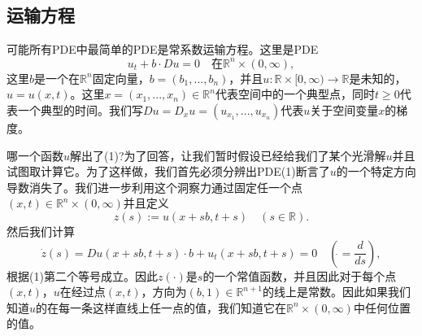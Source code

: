 \documentclass[leqno]{article}
\numberwithin{equation}{subsection}%
\begin{document}
\subsection{运输方程}
\noindent 可能所有PDE中最简单的PDE是常系数运输方程。这里是PDE
\begin{equation}
u_{t}+b\cdot Du=0\quad\text{在}\mathbb{R}^{n}\times (0,\infty),
\end{equation}
这里$b$是一个在$\mathbb{R}^{n}$固定向量，$b=(b_{1},...,b_{n})$，并且$u:\mathbb{R}\times[0,\infty)\rightarrow\mathbb{R}$是未知的，$u=u(x,t)$。这里$x=(x_{1},...,x_{n})\in\mathbb{R}^{n}$代表空间中的一个典型点，同时$t\geq 0$代表一个典型的时间。我们写$Du=D_{x}u=(u_{x_{1}},...,u_{x_{n}})$代表$u$关于空间变量$x$的梯度。\par
哪一个函数$u$解出了(1)?为了回答，让我们暂时假设已经给我们了某个光滑解$u$并且试图取计算它。为了这样做，我们首先必须分辨出PDE(1)断言了$u$的一个特定方向导数消失了。我们进一步利用这个洞察力通过固定任一个点$(x,t)\in\mathbb{R}^{n}\times(0,\infty)$并且定义
\begin{equation*}
z(s):=u(x+sb,t+s)\quad(s\in\mathbb{R}).
\end{equation*}
然后我们计算
\begin{equation*}
\dot{z}(s)=Du(x+sb,t+s)\cdot b+u_{t}(x+sb,t+s)=0\quad \left(\dot{}
 =\frac{d}{ds}\right),
\end{equation*}
根据(1)第二个等号成立。因此$z(\cdot)$是$s$的一个常值函数，并且因此对于每个点$(x,t)$，$u$在经过点$(x,t)$，方向为$(b,1)\in\mathbb{R}^{n+1}$的线上是常数。因此如果我们知道$u$的在每一条这样直线上任一点的值，我们知道它在$\mathbb{R}^{n}\times(0,\infty)$中任何位置的值。


\renewcommand{\thesubsubsection}{\arabic{section}.\arabic{subsection}.\arabic{subsubsection}.}
\end{document}
